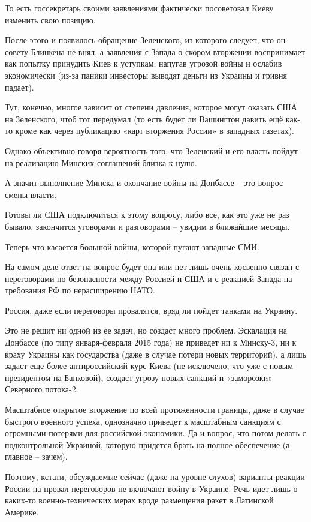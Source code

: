 То есть госсекретарь своими заявлениями фактически посоветовал Киеву изменить
свою позицию. 

После этого и появилось обращение Зеленского, из которого следует, что он
совету Блинкена не внял, а заявления с Запада о скором вторжении воспринимает
как попытку принудить Киев к уступкам, напугав угрозой войны и ослабив
экономически (из-за паники инвесторы выводят деньги из Украины и гривня
падает).

Тут, конечно, многое зависит от степени давления, которое могут оказать США на
Зеленского, чтоб тот передумал (то есть будет ли Вашингтон давить ещё как-то
кроме как через публикацию «карт вторжения России» в западных газетах).

Однако объективно говоря вероятность того, что Зеленский и его власть пойдут на
реализацию Минских соглашений близка к нулю.

А значит выполнение Минска и окончание войны на Донбассе – это вопрос смены
власти.

Готовы ли США подключиться к этому вопросу, либо все, как это уже не раз
бывало, закончится  уговорами и разговорами – увидим в ближайшие месяцы.

Теперь что касается большой войны, которой пугают западные СМИ.

На самом деле ответ на вопрос будет она или нет лишь очень косвенно связан с
переговорами по безопасности между Россией и США и с реакцией Запада на
требования РФ по нерасширению НАТО.

Россия, даже если переговоры провалятся, вряд ли пойдет танками на Украину. 

Это не решит ни одной из ее задач, но создаст много проблем. Эскалация на
Донбассе (по типу января-февраля 2015 года) не приведет ни к Минску-3, ни к
краху Украины как государства (даже в случае потери новых территорий), а лишь
задаст еще более антироссийский курс Киева (не исключено, что уже с новым
президентом на Банковой), создаст угрозу новых санкций и «заморозки» Северного
потока-2.

Масштабное открытое вторжение по всей протяженности границы, даже в случае
быстрого военного успеха, однозначно приведет к масштабным санкциям с огромными
потерями для российской экономики. Да и вопрос, что потом делать с
подконтрольной Украиной, которую придется брать на полное обеспечение (а
главное – зачем).

Поэтому, кстати, обсуждаемые сейчас (даже на уровне слухов) варианты реакции
России на провал переговоров не включают войну в Украине. Речь идет лишь о
каких-то военно-технических мерах вроде размещения ракет в Латинской Америке.


